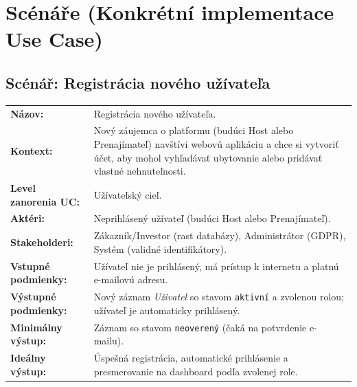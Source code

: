 \documentclass[11pt, a4paper]{article}
\makeatletter
\newenvironment{scenparams}{%
  \par\vspace{0.1cm}%
  \noindent{\color{ruleblue}\rule{\textwidth}{0.8pt}}\nopagebreak%
  \vspace{2pt}\par\nopagebreak%
  \begin{tabular}{@{}p{4.7cm}@{\hspace{0.1cm}}p{\dimexpr\textwidth-5.0cm\relax}@{}}%
}{%
  \end{tabular}%
  \par\vspace{-2pt}%
  \noindent{\color{ruleblue}\rule{\textwidth}{0.8pt}}%
  \vspace{0.35cm}%
}
\newcommand{\sprow}[2]{\textbf{#1:} & #2 \\[3pt]}
\makeatother
\begin{document}
\newpage

\section{Scénáře (Konkrétní implementace Use Case)}

\subsection{\textcolor{newblue}{Scénář: Registrácia nového užívateľa}}

{\color{newblue}
\begin{scenparams}
  \sprow{Názov}{Registrácia nového užívateľa.}
  \sprow{Kontext}{Nový záujemca o platformu (budúci Host alebo Prenajímateľ) navštívi webovú aplikáciu a chce si vytvoriť účet, aby mohol vyhľadávať ubytovanie alebo pridávať vlastné nehnuteľnosti.}
  \sprow{Level zanorenia UC}{Užívateľský cieľ.}
  \sprow{Aktéri}{Neprihlásený užívateľ (budúci Host alebo Prenajímateľ).}
  \sprow{Stakeholderi}{Zákazník/Investor (rast databázy), Administrátor (GDPR), Systém (validné identifikátory).}
  \sprow{Vstupné podmienky}{Užívateľ nie je prihlásený, má prístup k internetu a platnú e-mailovú adresu.}
  \sprow{Výstupné podmienky}{Nový záznam \textit{Uživatel} so stavom \texttt{aktivní} a zvolenou rolou; užívateľ je automaticky prihlásený.}
  \sprow{Minimálny výstup}{Záznam so stavom \texttt{neoverený} (čaká na potvrdenie e-mailu).}
  \sprow{Ideálny výstup}{Úspešná registrácia, automatické prihlásenie a presmerovanie na dashboard podľa zvolenej role.}
\end{scenparams}

}
\end{document}
